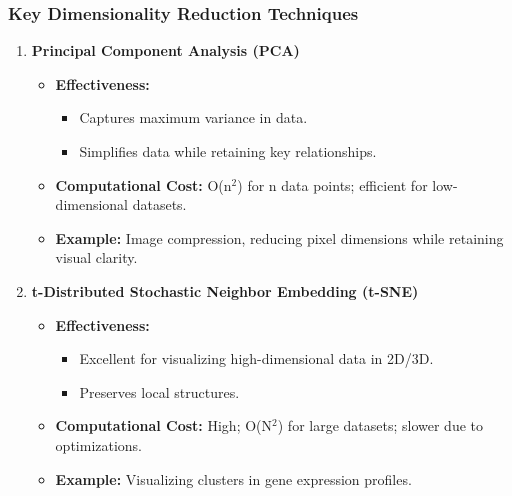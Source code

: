 \documentclass[aspectratio=169]{beamer}
\begin{document}
\begin{frame}[fragile]
    \frametitle{Key Dimensionality Reduction Techniques}
    \begin{enumerate}
        \item \textbf{Principal Component Analysis (PCA)}
            \begin{itemize}
                \item \textbf{Effectiveness:}
                \begin{itemize}
                    \item Captures maximum variance in data.
                    \item Simplifies data while retaining key relationships.
                \end{itemize}
                \item \textbf{Computational Cost:} O(n$^2$) for n data points; efficient for low-dimensional datasets.
                \item \textbf{Example:} Image compression, reducing pixel dimensions while retaining visual clarity.
            \end{itemize}
        
        \item \textbf{t-Distributed Stochastic Neighbor Embedding (t-SNE)}
            \begin{itemize}
                \item \textbf{Effectiveness:}
                \begin{itemize}
                    \item Excellent for visualizing high-dimensional data in 2D/3D.
                    \item Preserves local structures.
                \end{itemize}
                \item \textbf{Computational Cost:} High; O(N$^2$) for large datasets; slower due to optimizations.
                \item \textbf{Example:} Visualizing clusters in gene expression profiles.
            \end{itemize}
    \end{enumerate}
\end{frame}
\end{document}
